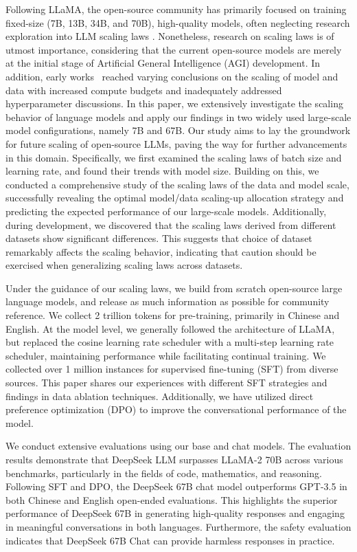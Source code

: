Following LLaMA, the open-source community has primarily focused on training fixed-size (7B, 13B, 34B, and 70B), high-quality models, often neglecting research exploration into LLM scaling laws \citep{scalinglaw,chinchilla}. Nonetheless, research on scaling laws is of utmost importance, considering that the current open-source models are merely at the initial stage of Artificial General Intelligence (AGI) development. In addition, early works~\citep{scalinglaw, chinchilla} reached varying conclusions on the scaling of model and data with increased compute budgets and inadequately addressed hyperparameter discussions. In this paper, we extensively investigate the scaling behavior of language models and apply our findings in two widely used large-scale model configurations, namely 7B and 67B. Our study aims to lay the groundwork for future scaling of open-source LLMs, paving the way for further advancements in this domain. Specifically, we first examined the scaling laws of batch size and learning rate, and found their trends with model size. Building on this, we conducted a comprehensive study of the scaling laws of the data and model scale, successfully revealing the optimal model/data scaling-up allocation strategy and predicting the expected performance of our large-scale models. Additionally, during development, we discovered that the scaling laws derived from different datasets show significant differences. This suggests that choice of dataset remarkably affects the scaling behavior, indicating that caution should be exercised when generalizing scaling laws across datasets.

Under the guidance of our scaling laws, we build from scratch open-source large language models, and release as much information as possible for community reference. We collect 2 trillion tokens for pre-training, primarily in Chinese and English. At the model level, we generally followed the architecture of LLaMA, but replaced the cosine learning rate scheduler with a multi-step learning rate scheduler, maintaining performance while facilitating continual training.  We collected over  1 million instances for supervised fine-tuning (SFT) \citep{ouyang2022training} from diverse sources.  This paper shares our experiences with different SFT strategies and findings in data ablation techniques. Additionally, we have utilized direct preference optimization (DPO) \citep{dpo} to improve the conversational performance of the model.

We conduct extensive evaluations using our base and chat models. The evaluation results demonstrate that DeepSeek LLM surpasses LLaMA-2 70B across various benchmarks, particularly in the fields of code, mathematics, and reasoning. Following SFT and DPO, the DeepSeek 67B chat model outperforms GPT-3.5 in both Chinese and English open-ended evaluations. This highlights the superior performance of DeepSeek 67B in generating high-quality responses and engaging in meaningful conversations in both languages. Furthermore, the safety evaluation indicates that DeepSeek 67B Chat can provide harmless responses in practice. 

